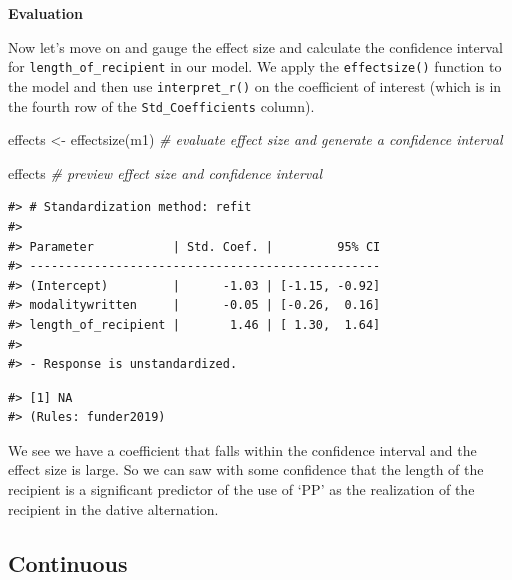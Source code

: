 \documentclass[
  letterpaper,
]{latex/krantz}
\newenvironment{Shaded}{\begin{snugshade}}{\end{snugshade}}
\newcommand{\CommentTok}[1]{\textcolor[rgb]{0.00,0.00,0.00}{\textit{#1}}}
\newcommand{\DecValTok}[1]{\textcolor[rgb]{0.00,0.00,0.00}{#1}}
\newcommand{\FunctionTok}[1]{\textcolor[rgb]{0.00,0.00,0.00}{#1}}
\newcommand{\NormalTok}[1]{\textcolor[rgb]{0.00,0.00,0.00}{#1}}
\newcommand{\OtherTok}[1]{\textcolor[rgb]{0.00,0.00,0.00}{#1}}
\newcommand{\SpecialCharTok}[1]{\textcolor[rgb]{0.00,0.00,0.00}{#1}}
\begin{document}
\textbf{Evaluation}

Now let's move on and gauge the effect size and calculate the confidence
interval for \texttt{length\_of\_recipient} in our model. We apply the
\texttt{effectsize()} function to the model and then use
\texttt{interpret\_r()} on the coefficient of interest (which is in the
fourth row of the \texttt{Std\_Coefficients} column).

\begin{Shaded}
\begin{Highlighting}[]
\NormalTok{effects }\OtherTok{\textless{}{-}} \FunctionTok{effectsize}\NormalTok{(m1) }\CommentTok{\# evaluate effect size and generate a confidence interval}

\NormalTok{effects }\CommentTok{\# preview effect size and confidence interval}
\end{Highlighting}
\end{Shaded}

\begin{verbatim}
#> # Standardization method: refit
#> 
#> Parameter           | Std. Coef. |         95% CI
#> -------------------------------------------------
#> (Intercept)         |      -1.03 | [-1.15, -0.92]
#> modalitywritten     |      -0.05 | [-0.26,  0.16]
#> length_of_recipient |       1.46 | [ 1.30,  1.64]
#> 
#> - Response is unstandardized.
\end{verbatim}

\begin{Shaded}
\end{Shaded}

\begin{verbatim}
#> [1] NA
#> (Rules: funder2019)
\end{verbatim}

We see we have a coefficient that falls within the confidence interval
and the effect size is large. So we can saw with some confidence that
the length of the recipient is a significant predictor of the use of
`PP' as the realization of the recipient in the dative alternation.

\hypertarget{continuous-2}{%
\subsection{Continuous}\label{continuous-2}}
\end{document}
